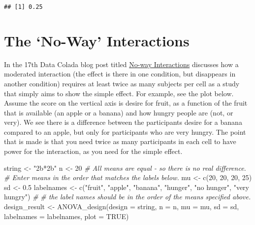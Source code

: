 \documentclass[
]{book}
\newenvironment{Shaded}{\begin{snugshade}}{\end{snugshade}}
\newcommand{\AttributeTok}[1]{\textcolor[rgb]{0.77,0.63,0.00}{#1}}
\newcommand{\CommentTok}[1]{\textcolor[rgb]{0.56,0.35,0.01}{\textit{#1}}}
\newcommand{\ConstantTok}[1]{\textcolor[rgb]{0.00,0.00,0.00}{#1}}
\newcommand{\DecValTok}[1]{\textcolor[rgb]{0.00,0.00,0.81}{#1}}
\newcommand{\FloatTok}[1]{\textcolor[rgb]{0.00,0.00,0.81}{#1}}
\newcommand{\FunctionTok}[1]{\textcolor[rgb]{0.00,0.00,0.00}{#1}}
\newcommand{\NormalTok}[1]{#1}
\newcommand{\OtherTok}[1]{\textcolor[rgb]{0.56,0.35,0.01}{#1}}
\newcommand{\StringTok}[1]{\textcolor[rgb]{0.31,0.60,0.02}{#1}}
\begin{document}
\begin{verbatim}
## [1] 0.25
\end{verbatim}

\hypertarget{the-no-way-interactions}{%
\chapter{The `No-Way' Interactions}\label{the-no-way-interactions}}

In the 17th Data Colada blog post titled \href{http://datacolada.org/17}{No-way Interactions} \citet{simonsohn_2014} discusses how a moderated interaction (the effect is there in one condition, but disappears in another condition) requires at least twice as many subjects per cell as a study that simply aims to show the simple effect. For example, see the plot below. Assume the score on the vertical axis is desire for fruit, as a function of the fruit that is available (an apple or a banana) and how hungry people are (not, or very). We see there is a difference between the participants desire for a banana compared to an apple, but only for participants who are very hungry. The point that is made is that you need twice as many participants in each cell to have power for the interaction, as you need for the simple effect.

\begin{Shaded}
\begin{Highlighting}[]
\NormalTok{string }\OtherTok{\textless{}{-}} \StringTok{"2b*2b"}
\NormalTok{n }\OtherTok{\textless{}{-}} \DecValTok{20}
\CommentTok{\# All means are equal {-} so there is no real difference.}
\CommentTok{\# Enter means in the order that matches the labels below.}
\NormalTok{mu }\OtherTok{\textless{}{-}} \FunctionTok{c}\NormalTok{(}\DecValTok{20}\NormalTok{, }\DecValTok{20}\NormalTok{, }\DecValTok{20}\NormalTok{, }\DecValTok{25}\NormalTok{) }
\NormalTok{sd }\OtherTok{\textless{}{-}} \FloatTok{0.5}
\NormalTok{labelnames }\OtherTok{\textless{}{-}} \FunctionTok{c}\NormalTok{(}\StringTok{"fruit"}\NormalTok{, }\StringTok{"apple"}\NormalTok{, }\StringTok{"banana"}\NormalTok{, }
                \StringTok{"hunger"}\NormalTok{, }\StringTok{"no hunger"}\NormalTok{, }\StringTok{"very hungry"}\NormalTok{) }\CommentTok{\#}
\CommentTok{\# the label names should be in the order of the means specified above.}
\NormalTok{design\_result }\OtherTok{\textless{}{-}} \FunctionTok{ANOVA\_design}\NormalTok{(}\AttributeTok{design =}\NormalTok{ string,}
                   \AttributeTok{n =}\NormalTok{ n, }
                   \AttributeTok{mu =}\NormalTok{ mu, }
                   \AttributeTok{sd =}\NormalTok{ sd, }
                   \AttributeTok{labelnames =}\NormalTok{ labelnames,}
                   \AttributeTok{plot =} \ConstantTok{TRUE}\NormalTok{)}
\end{Highlighting}
\end{Shaded}
\end{document}
